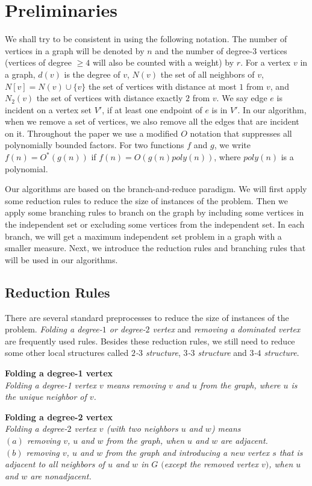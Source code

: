 \documentclass[runningheads]{llncs}
\begin{document}
\section{Preliminaries}
We shall try to be consistent in using the following notation. The
number of vertices in a graph will be denoted by $n$ and the
number of degree-$3$ vertices (vertices of degree $\geq 4$ will
also be counted with a weight) by $r$. For a vertex $v$ in a
graph, $d(v)$ is the degree of $v$, $N(v)$ the set of all
neighbors of $v$, $N[v]=N(v)\cup\{v\}$ the set of vertices with
distance at most $1$ from $v$, and $N_2(v)$ the set of vertices
with distance exactly $2$ from $v$. We say edge $e$ is incident on
a vertex set $V'$, if at least one endpoint of $e$ is in $V'$. In
our algorithm, when we remove a set of vertices, we also remove
all the edges that are incident on it. Throughout the paper we use
a modified $O$ notation that suppresses all polynomially bounded
factors. For two functions $f$ and $g$, we write $f(n) =
O^*(g(n))$ if $f(n) = O(g(n)poly(n))$, where $poly(n)$ is a
polynomial.


Our algorithms are based on the branch-and-reduce paradigm. We
will first apply some reduction rules to reduce the size of
instances of the problem. Then we apply some branching rules to
branch on the graph by including some vertices in the independent
set or excluding some vertices from the independent set. In each
branch, we will get a maximum independent set problem in a graph
with a smaller measure. Next, we introduce the reduction rules and
branching rules that will be used in our algorithms.

\subsection{Reduction Rules}
There are several standard preprocesses to reduce the size of
instances of the problem. \emph{Folding a degree-$1$ or degree-$2$
vertex} and \emph{removing a dominated vertex} are frequently used
rules. Besides these reduction rules, we still need to reduce some
other local structures called \emph{$2$-$3$ structure},
\emph{$3$-$3$ structure} and \emph{$3$-$4$ structure}.

\vspace{2mm}\noindent \textbf{Folding a degree-1 vertex}\\
\emph{Folding a degree-1 vertex $v$ means removing $v$ and $u$
from the graph, where $u$ is the unique neighbor of $v$.}

\vspace{2mm}\noindent \textbf{Folding a degree-2 vertex}\\
\emph{Folding a degree-$2$ vertex $v$ (with two neighbors $u$ and
$w$) means\\
$(a)$ removing $v$, $u$ and $w$ from the
graph, when $u$ and $w$ are adjacent.\\
$(b)$ removing $v$, $u$ and $w$ from the graph and introducing a
new vertex $s$ that is adjacent to all neighbors of $u$ and $w$ in
$G$ $($except the removed vertex $v)$, when $u$ and $w$ are
nonadjacent.}
\end{document}
